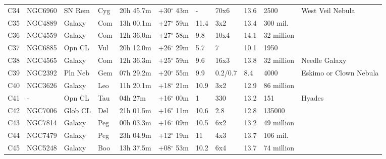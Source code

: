 \documentclass[10pt,twoside,a4paper,english]{article}
\begin{document}
\begin{longtable}{@{}lllllllllll@{}}
C34        & NGC6960     & SN Rem     & Cyg       & 20h 45.7m & +30$^{\circ}$ 43m  & -         & 70x6                 & 13.6     & 2500                & West Veil Nebula                \\ 
C35        & NGC4889     & Galaxy     & Com       & 13h 00.1m & +27$^{\circ}$ 59m  & 11.4      & 3x2                  & 13.4     & 300 mil.            &                                 \\ 
C36        & NGC4559     & Galaxy     & Com       & 12h 36.0m & +27$^{\circ}$ 58m  & 9.8       & 10x4                 & 14.1     & 32 million          &                                 \\ 
C37        & NGC6885     & Opn CL     & Vul       & 20h 12.0m & +26$^{\circ}$ 29m  & 5.7       & 7                    & 10.1     & 1950                &                                 \\ 
C38        & NGC4565     & Galaxy     & Com       & 12h 36.3m & +25$^{\circ}$ 59m  & 9.6       & 16x3                 & 13.8     & 32 million          & Needle Galaxy                   \\ 
C39        & NGC2392     & Pln Neb    & Gem       & 07h 29.2m & +20$^{\circ}$ 55m  & 9.9       & 0.2/0.7              & 8.4      & 4000                & Eskimo or Clown Nebula          \\ 
C40        & NGC3626     & Galaxy     & Leo       & 11h 20.1m & +18$^{\circ}$ 21m  & 10.9      & 3x2                  & 12.9     & 86 million          &                                 \\ 
C41        & -           & Opn CL     & Tau       & 04h 27m   & +16$^{\circ}$ 00m  & 1         & 330                  & 13.2     & 151                 & Hyades                          \\ 
C42        & NGC7006     & Glob CL    & Del       & 21h 01.5m & +16$^{\circ}$ 11m  & 10.6      & 2.8                  & 12.8     & 135000              &                                 \\ 
C43        & NGC7814     & Galaxy     & Peg       & 00h 03.3m & +16$^{\circ}$ 09m  & 10.5      & 6x2                  & 13.2     & 49 million          &                                 \\ 
C44        & NGC7479     & Galaxy     & Peg       & 23h 04.9m & +12$^{\circ}$ 19m  & 11        & 4x3                  & 13.7     & 106 mil.            &                                 \\ 
C45        & NGC5248     & Galaxy     & Boo       & 13h 37.5m & +08$^{\circ}$ 53m  & 10.2      & 6x4                  & 13.7     & 74 million          &                                 \\ 

\end{longtable}
\end{document}
